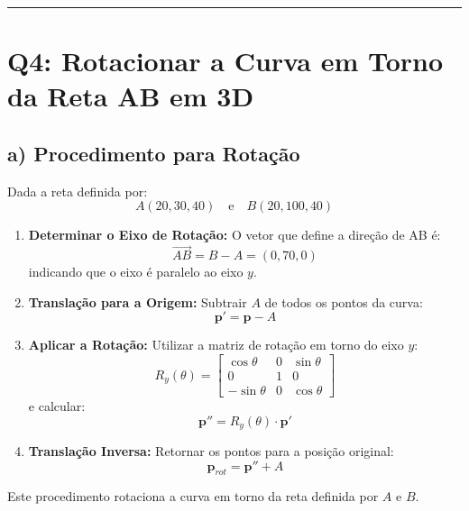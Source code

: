\documentclass[a4paper,12pt]{article}
\begin{document}
\hrule
\vspace{0.5cm}

\section*{Q4: Rotacionar a Curva em Torno da Reta AB em 3D}

\subsection*{a) Procedimento para Rotação}
Dada a reta definida por:
\[
A(20,30,40) \quad \text{e} \quad B(20,100,40)
\]

\begin{enumerate}
    \item \textbf{Determinar o Eixo de Rotação:}  
    O vetor que define a direção de AB é:
    \[
    \vec{AB} = B - A = (0,70,0)
    \]
    indicando que o eixo é paralelo ao eixo \( y \).
    
    \item \textbf{Translação para a Origem:}  
    Subtrair \( A \) de todos os pontos da curva:
    \[
    \mathbf{p}' = \mathbf{p} - A
    \]
    
    \item \textbf{Aplicar a Rotação:}  
    Utilizar a matriz de rotação em torno do eixo \( y \):
    \[
    R_y(\theta) =
    \begin{bmatrix}
    \cos\theta & 0 & \sin\theta \\
    0 & 1 & 0 \\
    -\sin\theta & 0 & \cos\theta
    \end{bmatrix}
    \]
    e calcular:
    \[
    \mathbf{p}'' = R_y(\theta) \cdot \mathbf{p}'
    \]
    
    \item \textbf{Translação Inversa:}  
    Retornar os pontos para a posição original:
    \[
    \mathbf{p}_{rot} = \mathbf{p}'' + A
    \]
\end{enumerate}

Este procedimento rotaciona a curva em torno da reta definida por \( A \) e \( B \).
\end{document}
